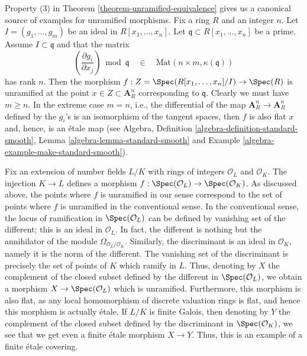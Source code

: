 \begin{example}
\label{example-standard-etale}
Property (3) in
Theorem \ref{theorem-unramified-equivalence}
gives us a canonical source of examples for unramified morphisms.
Fix a ring $R$ and an integer $n$. Let $I = (g_1, \ldots, g_m)$ be an
ideal in $R[x_1, \ldots, x_n]$. Let $\mathfrak q \subset R[x_1, \ldots, x_n]$
be a prime. Assume $I \subset \mathfrak q$ and that the matrix
$$
\left(\frac{\partial g_i}{\partial x_j}\right) \bmod \mathfrak q
\quad\in\quad
\text{Mat}(n \times m, \kappa(\mathfrak q))
$$
has rank $n$. Then the morphism
$f : Z = \Spec(R[x_1, \ldots, x_n]/I) \to \Spec(R)$
is unramified at the point $x \in Z \subset \mathbf{A}^n_R$ corresponding
to $\mathfrak q$. Clearly we must have $m \geq n$.
In the extreme case $m = n$, i.e., the differential of the map
$\mathbf{A}^n_R \to \mathbf{A}^n_R$ defined by the $g_i$'s
is an isomorphism of the tangent spaces, then $f$ is also flat
$x$ and, hence, is an \'etale map (see Algebra,
Definition \ref{algebra-definition-standard-smooth},
Lemma \ref{algebra-lemma-standard-smooth} and
Example \ref{algebra-example-make-standard-smooth}).
\end{example}

\begin{example}
\label{example-number-theory-etale}
Fix an extension of number fields $L/K$ with rings of integers
$\mathcal{O}_L$ and $\mathcal{O}_K$. The injection $K \to L$ defines a
morphism $f : \Spec(\mathcal{O}_L) \to \Spec(\mathcal{O}_K)$.
As discussed above, the points where $f$ is unramified in our sense
correspond to the set of points where $f$ is unramified in the conventional
sense. In the conventional sense, the locus of ramification in
$\Spec(\mathcal{O}_L)$ can be defined by vanishing set of the
different; this is an ideal in $\mathcal{O}_L$. In fact, the different is
nothing but the annihilator of the module
$\Omega_{\mathcal{O}_L/\mathcal{O}_K}$. Similarly, the
discriminant is an ideal in $\mathcal{O}_K$, namely it is the
norm of the different.
The vanishing set of the discriminant is precisely the set
of points of $K$ which ramify in $L$.
Thus, denoting by $X$ the complement of the closed subset
defined by the different in $\Spec(\mathcal{O}_L)$,
we obtain a morphism $X \to \Spec(\mathcal{O}_L)$ which is unramified.
Furthermore, this morphism is also flat, as any local homomorphism
of discrete valuation rings is flat, and hence this morphism is
actually \'etale. If $L/K$ is finite Galois, then denoting by
$Y$ the complement of the closed subset defined by the discriminant in
$\Spec(\mathcal{O}_K)$, we see that we get even a
finite \'etale morphism $X \to Y$.
Thus, this is an example of a finite \'etale covering.
\end{example}





